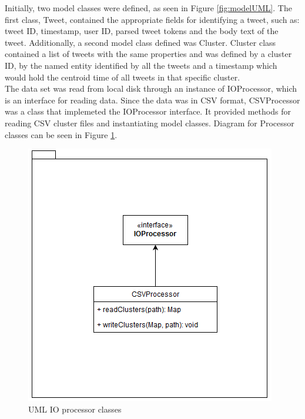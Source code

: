 \documentclass[a4paper,portrait,12pt]{article}
\begin{document}
Initially, two model classes were defined, as seen in Figure \ref{fig:modelUML}.
The first class, Tweet, contained the appropriate fields for identifying a tweet, such as: tweet ID, timestamp, user ID, parsed tweet tokens and the body text of the tweet.
Additionally, a second model class defined was Cluster. 
Cluster class contained a list of tweets with the same properties and was defined by a cluster ID, by the named entity identified by all the tweets and a timestamp which would hold the centroid time of all tweets in that specific cluster.\\

The data set was read from local disk through an instance of IOProcessor, which is an interface for reading data.
Since the data was in CSV format, CSVProcessor was a class that implemeted the IOProcessor interface.
It provided methods for reading CSV cluster files and instantiating model classes.
Diagram for Processor classes can be seen in Figure \ref{fig:processorUML}. \\

\begin{figure}[h!]
	\centering
	\includegraphics[width=0.5\linewidth]{images/processorUML.png}
	\caption{UML IO processor classes}
	\label{fig:processorUML}
\end{figure}
\end{document}
